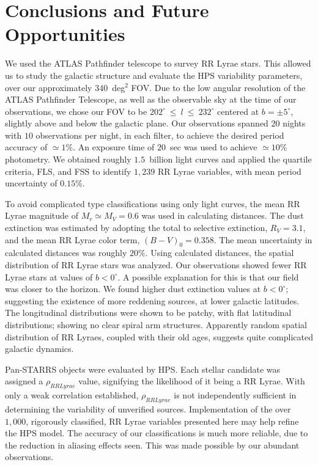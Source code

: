 \documentclass[aps,prb,twocolumn,superscriptaddress]{revtex4-1}
\begin{document}
\section{Conclusions and Future Opportunities}

We used the ATLAS Pathfinder telescope to survey RR Lyrae stars.  This allowed us to study the galactic structure and evaluate the HPS variability parameters, over our approximately $340$~deg$^2$ FOV. Due to the low angular resolution of the ATLAS Pathfinder Telescope, as well as the observable sky at the time of our observations, we chose our FOV to be $202^{\circ}~\leq~l~\leq~232^{\circ}$ centered at $b=\pm5^{\circ}$, slightly above and below the galactic plane. Our observations spanned $20$ nights with $10$ observations per night, in each filter, to achieve the desired period accuracy of $\simeq 1\%$. An exposure time of $20$~sec was used to achieve $\simeq 10\%$ photometry. We obtained roughly $1.5$~billion light curves and applied the quartile criteria, FLS, and FSS to identify $1,239$ RR Lyrae variables, with mean period uncertainty of $0.15\%$.

\indent To avoid complicated type classifications using only light curves, the mean RR Lyrae magnitude of $M_r \simeq M_V = 0.6$ was used in calculating distances. The dust extinction was estimated by adopting the total to selective extinction, $R_V=3.1$, and the mean RR Lyrae color term, $(B-V)_0 = 0.358$. The mean uncertainty in calculated distances was roughly $20\%$.  Using calculated distances, the spatial distribution of RR Lyrae stars was analyzed. 
Our observations showed fewer RR Lyrae stars at values of $b<0^{\circ}$.  A possible explanation for this is that our field was closer to the horizon.
We found higher dust extinction values at $b<0^{\circ}$; suggesting the existence of more reddening sources, at lower galactic latitudes.  
The longitudinal distributions were shown to be patchy, with flat latitudinal distributions; showing no clear spiral arm structures. 
Apparently random spatial distribution of RR Lyraes, coupled with their old ages, suggests quite complicated galactic dynamics.


\indent Pan-STARRS objects were evaluated by HPS.  Each stellar candidate was assigned a $\rho_{RRLyrae}$ value, signifying the likelihood of it being a RR Lyrae.  With only a weak correlation established, $\rho_{RRLyrae}$ is not independently sufficient in determining the variability of unverified sources.  Implementation of the over $1,000$, rigorously classified, RR Lyrae variables presented here may help refine the HPS model.  The accuracy of our classifications is much more reliable, due to the reduction in aliasing effects seen.  This was made possible by our abundant observations.
\end{document}
